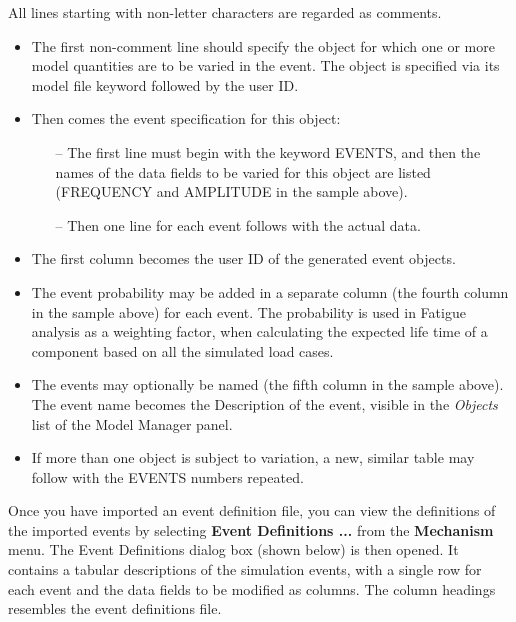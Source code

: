 \vskip1mm\noindent
All lines starting with non-letter characters are regarded as comments.

\begin{itemize}
\item
  The first non-comment line should specify the object for which one or more
  model quantities are to be varied in the event.
  The object is specified via its model file keyword followed by the user ID.
\item
  Then comes the event specification for this object:
  \begin{itemize}
  \item[--]
    The first line must begin with the keyword EVENTS, and then the names of the
    data fields to be varied for this object are listed (FREQUENCY and AMPLITUDE
    in the sample above).
  \item[--]
    Then one line for each event follows with the actual data.
    \end{itemize}
\item
  The first column becomes the user ID of the generated event objects.
\item
  The event probability may be added in a separate column (the fourth column in
  the sample above) for each event. The probability is used in Fatigue analysis
  as a weighting factor, when calculating the expected life time of a component
  based on all the simulated load cases.
\item
  The events may optionally be named (the fifth column in the sample above).
  The event name becomes the Description of the event, visible in the
  {\sl Objects} list of the Model Manager panel.
\item
  If more than one object is subject to variation, a new, similar table may
  follow with the EVENTS numbers repeated.
\end{itemize}




Once you have imported an event definition file, you can view the definitions of
the imported events by selecting \textbf{Event Definitions ...} from the
\textbf{Mechanism} menu. The Event Definitions dialog box (shown below) is then
opened. It contains a tabular descriptions of the simulation events,
with a single row for each event and the data fields to be modified as columns.
The column headings resembles the event definitions file.

